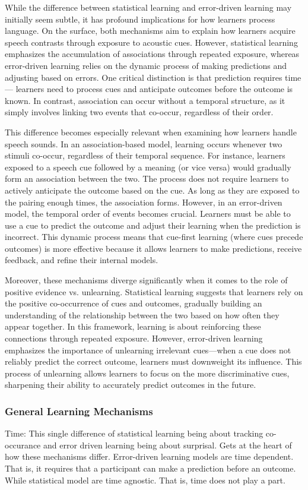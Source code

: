 While the difference between statistical learning and error-driven learning may initially seem subtle, it has profound implications for how learners process language. On the surface, both mechanisms aim to explain how learners acquire speech contrasts through exposure to acoustic cues. However, statistical learning emphasizes the accumulation of associations through repeated exposure, whereas error-driven learning relies on the dynamic process of making predictions and adjusting based on errors. One critical distinction is that prediction requires time— learners need to process cues and anticipate outcomes before the outcome is known. In contrast, association can occur without a temporal structure, as it simply involves linking two events that co-occur, regardless of their order.

This difference becomes especially relevant when examining how learners handle speech sounds. In an association-based model, learning occurs whenever two stimuli co-occur, regardless of their temporal sequence. For instance, learners exposed to a speech cue followed by a meaning (or vice versa) would gradually form an association between the two. The process does not require learners to actively anticipate the outcome based on the cue. As long as they are exposed to the pairing enough times, the association forms. However, in an error-driven model, the temporal order of events becomes crucial. Learners must be able to use a cue to predict the outcome and adjust their learning when the prediction is incorrect. This dynamic process means that cue-first learning (where cues precede outcomes) is more effective because it allows learners to make predictions, receive feedback, and refine their internal models.

Moreover, these mechanisms diverge significantly when it comes to the role of positive evidence vs. unlearning. Statistical learning suggests that learners rely on the positive co-occurrence of cues and outcomes, gradually building an understanding of the relationship between the two based on how often they appear together. In this framework, learning is about reinforcing these connections through repeated exposure. However, error-driven learning emphasizes the importance of unlearning irrelevant cues—when a cue does not reliably predict the correct outcome, learners must downweight its influence. This process of unlearning allows learners to focus on the more discriminative cues, sharpening their ability to accurately predict outcomes in the future.

\subsubsection{General Learning Mechanisms}
Time: This single difference of statistical learning being about tracking co-occurance and error driven learning being about surprisal. Gets at the heart of how these mechanisms differ. Error-driven learning models are time dependent. That is, it requires that a participant can make a prediction before an outcome. While statistical model are time agnostic. That is, time does not play a part. 

